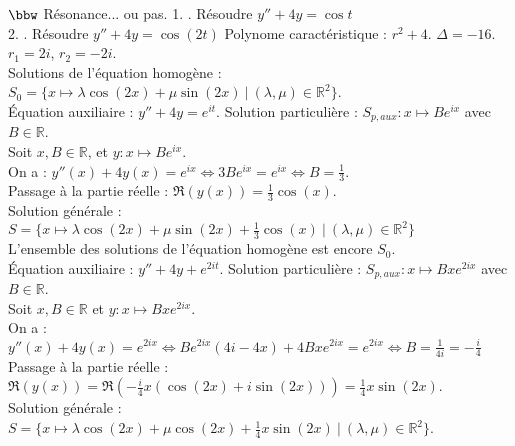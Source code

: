 \documentclass[11pt]{article}
\begin{document}
\begin{exercice}{$\bbw$ Résonance... ou pas.}{}
    1. . Résoudre $y'' + 4y = \cos t$\\
    2. . Résoudre $y'' + 4y = \cos(2t)$
    \tcblower
     Polynome caractéristique : $r^2 + 4$. $\Delta=-16$. $r_1 = 2i$, $r_2=-2i$.\\
    Solutions de l'équation homogène : $S_0 = \{x\mapsto \lambda\cos(2x) + \mu\sin(2x) ~ | ~ (\lambda, \mu) \in \mathbb{R}^2\}$.\\
    Équation auxiliaire : $y'' + 4y = e^{it}$. Solution particulière : $S_{p,aux}:x\mapsto Be^{ix}$ avec $B\in\mathbb{R}$.\\
    Soit $x,B\in\mathbb{R}$, et $y:x\mapsto Be^{ix}$.\\
    On a : $y''(x) + 4y(x) = e^{ix} \iff 3Be^{ix} = e^{ix} \iff B = \frac{1}{3}$.\\
    Passage à la partie réelle : $\Re(y(x)) = \frac{1}{3}\cos(x)$.\\
    Solution générale : $S = \{x\mapsto \lambda \cos(2x) + \mu \sin(2x) + \frac{1}{3}\cos(x) ~ | ~ (\lambda, \mu) \in \mathbb{R}^2\}$\\[0.2cm]
     L'ensemble des solutions de l'équation homogène est encore $S_0$.\\
    Équation auxiliaire : $y'' + 4y + e^{2it}$. Solution particulière : $S_{p,aux}:x\mapsto Bxe^{2ix}$ avec $B\in\mathbb{R}$.\\
    Soit $x,B\in\mathbb{R}$ et $y:x\mapsto Bxe^{2ix}$.\\
    On a : $y''(x) + 4y(x) = e^{2ix} \iff Be^{2ix}(4i-4x) + 4Bxe^{2ix} = e^{2ix} \iff B=\frac{1}{4i}=-\frac{i}{4}$\\
    Passage à la partie réelle : $\Re(y(x)) = \Re\left( -\frac{i}{4}x(\cos(2x) + i\sin(2x)) \right)=\frac{1}{4}x\sin(2x)$.\\
    Solution générale : $S=\{x\mapsto \lambda\cos(2x) + \mu\cos(2x) + \frac{1}{4}x\sin(2x) ~ | ~ (\lambda, \mu)\in\mathbb{R}^2\}$.
\end{exercice}
\end{document}

